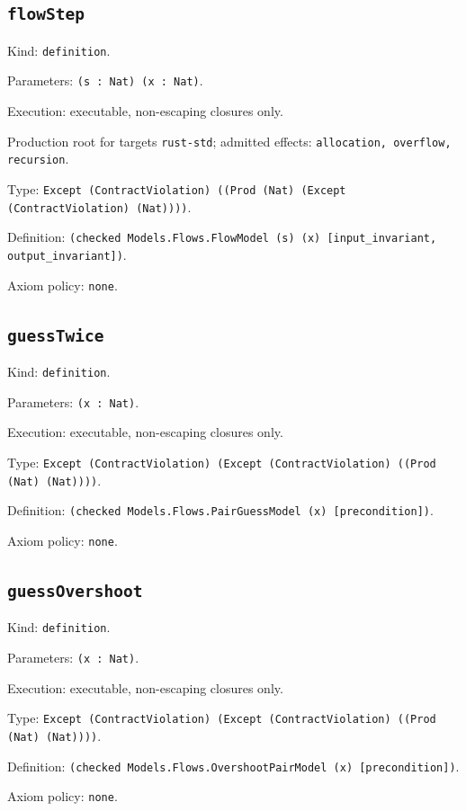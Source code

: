 \documentclass[11pt]{article}
\begin{document}
\subsection*{\texttt{flowStep}}
\noindent Kind: \texttt{definition}.\par
\noindent Parameters: \texttt{(s : Nat) (x : Nat)}.\par
\noindent Execution: executable, non-escaping closures only.\par
\noindent Production root for targets \texttt{rust-std}; admitted effects: \texttt{allocation, overflow, recursion}.\par
\noindent Type: \texttt{Except (ContractViolation) ((Prod (Nat) (Except (ContractViolation) (Nat))))}.\par
\noindent Definition: \texttt{(checked Models.Flows.FlowModel (s) (x) [input\_invariant, output\_invariant])}.\par
\noindent Axiom policy: \texttt{none}.\par
\subsection*{\texttt{guessTwice}}
\noindent Kind: \texttt{definition}.\par
\noindent Parameters: \texttt{(x : Nat)}.\par
\noindent Execution: executable, non-escaping closures only.\par
\noindent Type: \texttt{Except (ContractViolation) (Except (ContractViolation) ((Prod (Nat) (Nat))))}.\par
\noindent Definition: \texttt{(checked Models.Flows.PairGuessModel (x) [precondition])}.\par
\noindent Axiom policy: \texttt{none}.\par
\subsection*{\texttt{guessOvershoot}}
\noindent Kind: \texttt{definition}.\par
\noindent Parameters: \texttt{(x : Nat)}.\par
\noindent Execution: executable, non-escaping closures only.\par
\noindent Type: \texttt{Except (ContractViolation) (Except (ContractViolation) ((Prod (Nat) (Nat))))}.\par
\noindent Definition: \texttt{(checked Models.Flows.OvershootPairModel (x) [precondition])}.\par
\noindent Axiom policy: \texttt{none}.\par
\end{document}
